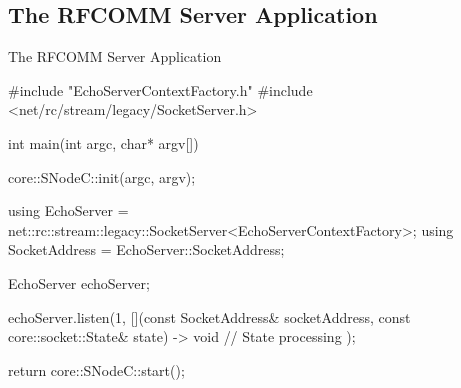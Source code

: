 ﻿\subsection{The RFCOMM Server Application}

\begin{frame}[fragile]{The RFCOMM Server Application}
  \begin{cppcode}[autogobble=true, caption={RFCOMM server application.},captionpos=b, morekeywords={[2]{SocketServer,EchoServerContextFactory,listen}}]
    #include "EchoServerContextFactory.h"
    #include <net/rc/stream/legacy/SocketServer.h>

    int main(int argc, char* argv[]) {
        core::SNodeC::init(argc, argv);

        using EchoServer = net::rc::stream::legacy::SocketServer<EchoServerContextFactory>;
        using SocketAddress = EchoServer::SocketAddress;

        EchoServer echoServer;

        echoServer.listen(1, [](const SocketAddress& socketAddress,
                                const core::socket::State& state) -> void {
            // State processing
        });

        return core::SNodeC::start();
    }
  \end{cppcode}
\end{frame}

